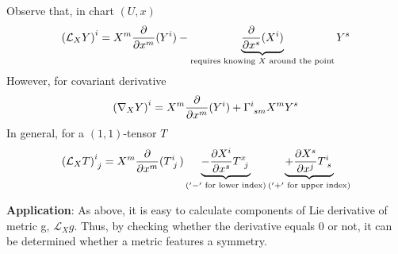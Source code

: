 Observe that, in chart $(U,x)$
\[
\left(\mathcal{L}_X Y\right)^i = X^m \frac{\partial }{\partial x^m}(Y^i) - \underbrace{\frac{\partial }{\partial x^s} (X^i)}_{\text{requires knowing } X \text{ around the point} } Y^s
\]
However, for covariant derivative
\[
\left(\nabla_X Y\right)^i = X^m \cibasis{x^m}(Y^i) + \ccf{i}{sm} X^m Y^s
\]
In general, for a $(1,1)$-tensor $T$
\[
\left(\mathcal{L}_X T \right)\indices{^i_j} = X^m \cibasis{x^m}(T\indices{^i_j}) \underbrace{- \cibasis[X^i]{x^s} T\indices{^x_j}}_{('-' \text{ for lower index})} \underbrace{+ \cibasis[X^s]{x^j} T\indices{^i_s}}_{('+' \text{ for upper index})}
\]

\textbf{Application}: As above, it is easy to calculate components of Lie derivative of metric g, $\mathcal{L}_X g$. Thus, by checking whether the derivative equals $0$ or not, it can be determined whether a metric features a symmetry.
